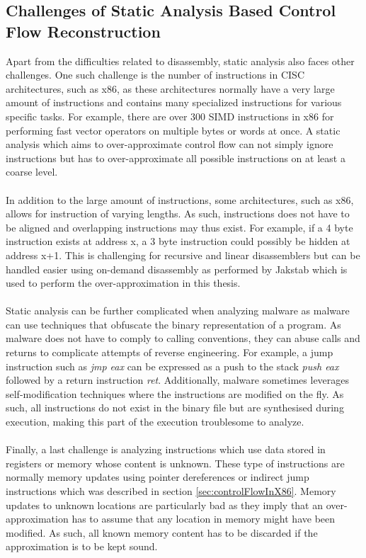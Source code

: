 \documentclass{kththesis}
\newcommand{\fbcomment}[1]{{#1}}
\renewcommand{\fbcomment}[1]{}
\renewcommand{\it}[1]{\textit{#1}}
\begin{document}
\subsection{Challenges of Static Analysis Based Control Flow Reconstruction}
\fbcomment{\color{red}Goal: Describe what makes static analysis difficult (For example, instructions of varying sizes).}
Apart from the difficulties related to disassembly, static analysis also faces other challenges. One such challenge is the number of instructions in CISC architectures, such as x86, as these architectures normally have a very large amount of instructions and contains many specialized instructions for various specific tasks\cite{intelX86Manual}. For example, there are over 300 SIMD instructions in x86 for performing fast vector operators on multiple bytes or words at once\cite{vectorInstructions}. A static analysis which aims to over-approximate control flow can not simply ignore instructions but has to over-approximate all possible instructions on at least a coarse level. 
\\ \\
In addition to the large amount of instructions, some architectures, such as x86, allows for instruction of varying lengths. As such, instructions does not have to be aligned and overlapping instructions may thus exist. For example, if a 4 byte instruction exists at address x, a 3 byte instruction could possibly be hidden at address x+1. This is challenging for recursive and linear disassemblers but can be handled easier using on-demand disassembly as performed by Jakstab which is used to perform the over-approximation in this thesis. 
\\ \\
Static analysis can be further complicated when analyzing malware as malware can use techniques that obfuscate the binary representation of a program\cite{StaticDisAndCodeAnal}. As malware does not have to comply to calling conventions, they can abuse calls and returns to complicate attempts of reverse engineering. For example, a jump instruction such as \it{jmp eax} can be expressed as a push to the stack \it{push eax} followed by a return instruction \it{ret}. Additionally, malware sometimes leverages self-modification techniques where the instructions are modified on the fly. As such, all instructions do not exist in the binary file but are synthesised during execution, making this part of the execution troublesome to analyze.
\\ \\
Finally, a last challenge is analyzing instructions which use data stored in registers or memory whose content is unknown. These type of instructions are normally memory updates using pointer dereferences or indirect jump instructions which was described in section \ref{sec:controlFlowInX86}\cite{Jakstab}. Memory updates to unknown locations are particularly bad as they imply that an over-approximation has to assume that any location in memory might have been modified. As such, all known memory content has to be discarded if the approximation is to be kept sound.
\end{document}
